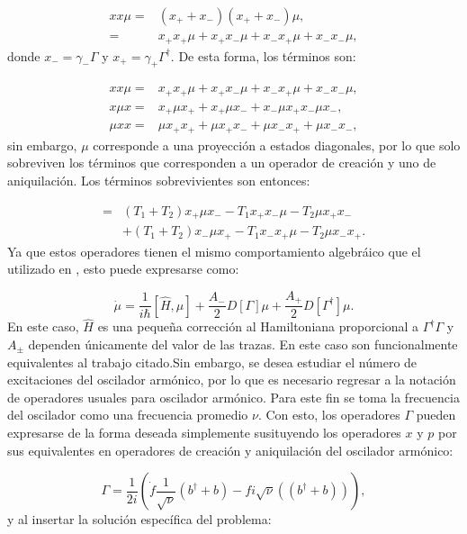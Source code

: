 \documentclass[a4paper,10pt]{report}
\begin{document}
\begin{align*}
xx\mu=& (x_++x_-)(x_++x_-)\mu,\\
=&x_+x_+\mu + x_+x_-\mu + x_-x_+\mu + x_-x_-\mu, 
\end{align*} donde $x_- = \gamma_- \Gamma$ y $x_+ = \gamma_+ \Gamma^{\dagger}$. De esta forma, los términos son:

\begin{align}
xx\mu=&x_+x_+\mu + x_+x_-\mu + x_-x_+\mu + x_-x_-\mu,\\
x\mu x=&x_+\mu x_+ + x_+\mu x_- + x_-\mu x_+ x_-\mu x_-,\\
\mu xx=& \mu x_+x_+ + \mu x_+x_-+ \mu x_-x_+ +\mu x_-x_-,
\end{align} sin embargo, $\mu$ corresponde a una proyección a estados diagonales, por lo que solo sobreviven los términos que corresponden a un operador de creación y uno de aniquilación. Los términos sobrevivientes son entonces:

\begin{align}
=&(T_1+T_2)x_+\mu x_- -T_1 x_+x_-\mu - T_2\mu x_+x_- \\ 
&+ \nonumber (T_1+T_2)x_-\mu x_+  -T_1 x_-x_+\mu -T_2 \mu x_-x_+.
\end{align} Ya que estos operadores tienen el mismo comportamiento algebráico que el utilizado en \cite{BarberisLC}, esto puede expresarse como:

\begin{equation}
\dot{\mu} = \frac{1}{i\hbar}[\hat{H},\mu] + \frac{A_-}{2}D[\Gamma]\mu + \frac{A_+}{2}D[\Gamma^\dagger]\mu.
\end{equation} En este caso, $\hat{H}$ es una pequeña corrección al Hamiltoniana proporcional a $\Gamma^\dagger \Gamma$ y $A_\pm$ dependen únicamente del valor de las trazas. En este caso son funcionalmente equivalentes al trabajo citado.Sin embargo, se desea estudiar el número de excitaciones del oscilador armónico, por lo que es necesario regresar a la notación de operadores usuales para oscilador armónico. Para este fin se toma la frecuencia del oscilador como una frecuencia promedio $\nu$. Con esto, los operadores $\Gamma$ pueden expresarse de la forma deseada simplemente susituyendo los operadores $x$ y $p$ por sus equivalentes en operadores de creación y aniquilación del oscilador armónico:

\begin{equation}
\Gamma = \frac{1}{2i}(\dot{f} \frac{1}{\sqrt{\nu}} (b^\dagger + b) - fi\sqrt{\nu}((b^\dagger + b))),
\end{equation} y al insertar la solución específica del problema:
\end{document}
